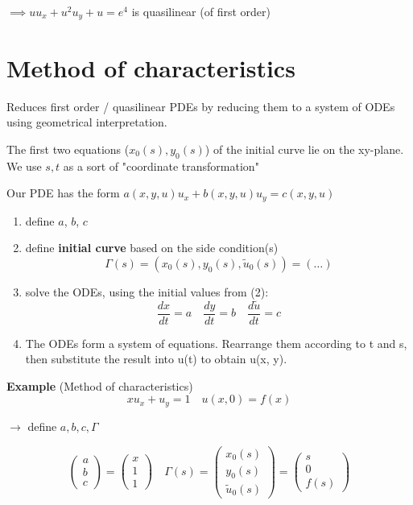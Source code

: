 $\implies uu_x + u^2u_y + u = e^4$ is quasilinear (of first order)

\section{Method of characteristics}
Reduces first order / quasilinear PDEs by reducing them to a system of ODEs using geometrical interpretation.

The first two equations ($x_0(s),y_0(s)$) of the initial curve lie on the xy-plane. We use $s,t$ as a sort of "coordinate transformation"
\begin{recipe}
Our PDE has the form $a(x,y,u)u_x + b(x,y,u)u_y = c(x,y,u)$
\begin{enumerate}
 \item define $a$, $b$, $c$
 \item define \textbf{initial curve} based on the side condition(s)
 $$\varGamma(s) = (x_0(s), y_0(s), \tilde{u}_0(s)) = (\dots)$$
 \item solve the ODEs, using the initial values from (2):
 $$\frac{dx}{dt}=a \quad \frac{dy}{dt}=b \quad \frac{d\tilde{u}}{dt}=c$$
 \item The ODEs form a system of equations. Rearrange them according to t and s, then substitute the result into u(t) to obtain u(x, y).
\end{enumerate}
\end{recipe}


\textbf{Example} (Method of characteristics)
$$xu_x+u_y = 1 \quad u(x,0)=f(x)$$

$\to$ define $a,b,c,\varGamma$

$$
\begin{pmatrix}
a\\b\\c
\end{pmatrix} = \begin{pmatrix}
x\\1\\1
\end{pmatrix} \quad \varGamma(s) = \begin{pmatrix}
x_{0}(s)\\y_{0}(s) \\\tilde{u}_{0}(s)
\end{pmatrix} = \begin{pmatrix}
s\\0\\f(s)
\end{pmatrix}
$$

